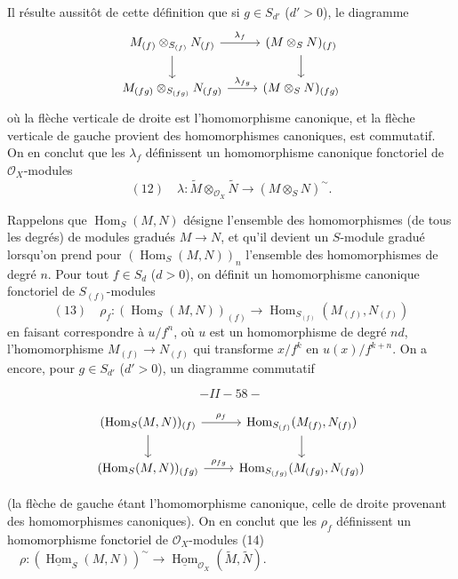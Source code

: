 Il résulte aussitôt de cette définition que si $g \in S_{d'}$ ($d'>0$), le diagramme
$$\begin{tikzcd} M_{(f)} \otimes_{S_{(f)}} N_{(f)} \arrow[r, "\lambda_f"] \arrow[d] & (M \otimes_S N)_{(f)} \arrow[d] \\ M_{(fg)} \otimes_{S_{(fg)}} N_{(fg)} \arrow[r, "\lambda_{fg}"] & (M \otimes_S N)_{(fg)} \end{tikzcd}$$
où la flèche verticale de droite est l'homomorphisme canonique, et la flèche verticale de gauche provient des homomorphismes canoniques, est commutatif. On en conclut que les $\lambda_f$ définissent un homomorphisme canonique fonctoriel de $\mathcal{O}_X$-modules
$$(12) \quad \lambda : \tilde{M} \otimes_{\mathcal{O}_X} \tilde{N} \to (M \otimes_S N)^\sim.$$

Rappelons que $\operatorname{Hom}_S(M, N)$ désigne l'ensemble des homomorphismes (de tous les degrés) de modules gradués $M \to N$, et qu'il devient un $S$-module gradué lorsqu'on prend pour $(\operatorname{Hom}_S(M, N))_n$ l'ensemble des homomorphismes de degré $n$. Pour tout $f \in S_d$ ($d>0$), on définit un homomorphisme canonique fonctoriel de $S_{(f)}$-modules
$$(13) \quad \rho_f : (\operatorname{Hom}_S(M, N))_{(f)} \to \operatorname{Hom}_{S_{(f)}}(M_{(f)}, N_{(f)})$$
en faisant correspondre à $u/f^n$, où $u$ est un homomorphisme de degré $nd$, l'homomorphisme $M_{(f)} \to N_{(f)}$ qui transforme $x/f^k$ en $u(x)/f^{k+n}$. On a encore, pour $g \in S_{d'}$ ($d'>0$), un diagramme commutatif


\newpage



$$- II-58 -$$

$$\begin{tikzcd}
(\operatorname{Hom}_S(M,N))_{(f)} \arrow[d] \arrow[r, "\rho_f"] & \operatorname{Hom}_{S_{(f)}}(M_{(f)}, N_{(f)}) \arrow[d] \\
(\operatorname{Hom}_S(M,N))_{(fg)} \arrow[r, "\rho_{fg}"] & \operatorname{Hom}_{S_{(fg)}}(M_{(fg)}, N_{(fg)})
\end{tikzcd}$$

(la flèche de gauche étant l'homomorphisme canonique, celle de droite provenant des homomorphismes canoniques). On en conclut que les $\rho_f$ définissent un homomorphisme fonctoriel de $\mathcal{O}_X$-modules
(14) $\quad \rho : (\underline{\operatorname{Hom}}_S(M,N))^{\sim} \to \underline{\operatorname{Hom}}_{\mathcal{O}_X}(\tilde{M}, \tilde{N})$.

